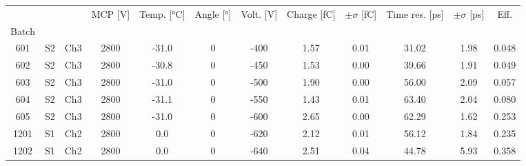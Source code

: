 \begin{tabular}{cccccccccccc}
\toprule
 &  &  & MCP [V] & Temp. [°C] & Angle [°] & Volt. [V] & Charge [fC] & \(\pm\sigma\) [fC] & Time res. [ps] & \(\pm\sigma\) [ps] & Eff. \\
Batch &  &  &  &  &  &  &  &  &  &  &  \\
\midrule
601 & S2 & Ch3 & 2800 & -31.0 & 0 & -400 & 1.57 & 0.01 & 31.02 & 1.98 & 0.048 \\
602 & S2 & Ch3 & 2800 & -30.8 & 0 & -450 & 1.53 & 0.00 & 39.66 & 1.91 & 0.049 \\
603 & S2 & Ch3 & 2800 & -31.0 & 0 & -500 & 1.90 & 0.00 & 56.00 & 2.09 & 0.057 \\
604 & S2 & Ch3 & 2800 & -31.1 & 0 & -550 & 1.43 & 0.01 & 63.40 & 2.04 & 0.080 \\
605 & S2 & Ch3 & 2800 & -31.0 & 0 & -600 & 2.65 & 0.00 & 62.29 & 1.62 & 0.253 \\
1201 & S1 & Ch2 & 2800 & 0.0 & 0 & -620 & 2.12 & 0.01 & 56.12 & 1.84 & 0.235 \\
1202 & S1 & Ch2 & 2800 & 0.0 & 0 & -640 & 2.51 & 0.04 & 44.78 & 5.93 & 0.358 \\
\bottomrule
\end{tabular}
